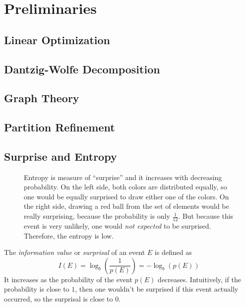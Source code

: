 \chapter{Preliminaries}

	\section{Linear Optimization}
	
		\clearpage
	
	\section{Dantzig-Wolfe Decomposition}
	
		\clearpage
	
	\section{Graph Theory}
	
		\clearpage
	
	\section{Partition Refinement}
	
		\clearpage
	
	\section{Surprise and Entropy}
	
		\begin{figure}[ht!]
			\centering
			
			\caption{Entropy is measure of \enquote{surprise} and it increases with decreasing probability. On the left side, both colors are distributed equally, so one would be equally surprised to draw either one of the colors. On the right side, drawing a red ball from the set of elements would be really surprising, because the probability is only $\frac{1}{12}$. But because this event is very unlikely, one would \textit{not expected} to be surprised. Therefore, the entropy is low.}
			\label{figure:prelim:entropy}
		\end{figure}
	
		The \textit{information value} or \textit{surprisal} of an event $E$ is defined as
		\begin{equation}
			I(E) = \log_b \left( \frac{1}{p(E)} \right) = - \log_b \left( p(E) \right)
		\end{equation}
		It increases as the probability of the event $p(E)$ decreases.
		Intuitively, if the probability is close to $1$, then one wouldn't be surprised if this event actually occurred, so the surprisal is close to $0$.
		
